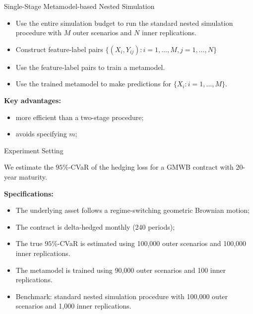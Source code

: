 \documentclass[9pt,handout]{beamer}
\begin{document}
\begin{frame}{Single-Stage Metamodel-based Nested Simulation}

\begin{algorithm}[H]
\caption{Single-Stage Metamodel-based Nested Simulation for VAs}
\begin{algorithmic}[1]
    \begin{itemize}
        \item Use the entire simulation budget to run the standard nested simulation procedure with $M$ outer scenarios and $N$ inner replications.
        \item Construct feature-label pairs $\{(X_i, Y_{ij}) : i=1, \ldots, M, j=1, \ldots, N\}$
    \end{itemize}
    \begin{itemize}
        \item Use the feature-label pairs to train a metamodel.
        \item Use the trained metamodel to make predictions for $\{X_i: i=1, \ldots, M\}$.
    \end{itemize}
\end{algorithmic}
\end{algorithm}

\textbf{Key advantages:}
\begin{itemize}
    \item more efficient than a two-stage procedure;
    \item avoids specifying $m$;
\end{itemize}

\end{frame}

\begin{frame}{Experiment Setting}

    We estimate the $95\%$-CVaR of the hedging loss for a GMWB contract with 20-year maturity.

    \vspace{10pt}

    \textbf{Specifications:}
    \begin{itemize}
        \item The underlying asset follows a regime-switching geometric Brownian motion;
        \item The contract is delta-hedged monthly (240 periods);
        \item The true $95\%$-CVaR is estimated using 100,000 outer scenarios and 100,000 inner replications.
        \item The metamodel is trained using 90,000 outer scenarios and 100 inner replications.
        \item Benchmark: standard nested simulation procedure with 100,000 outer scenarios and 1,000 inner replications.
    \end{itemize}

\end{frame}
\end{document}
